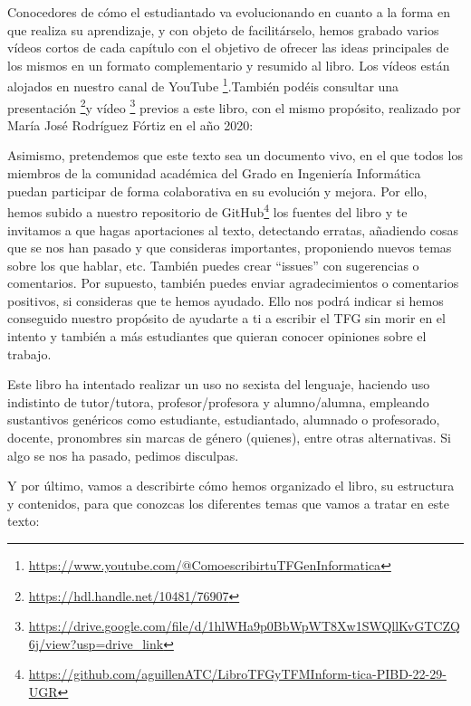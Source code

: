 Conocedores de cómo el estudiantado va evolucionando en cuanto a la forma en que realiza su aprendizaje, y con objeto de facilitárselo, hemos grabado varios vídeos cortos de cada capítulo con el objetivo de ofrecer las ideas principales de los mismos en un formato complementario y resumido al libro. Los vídeos están alojados en nuestro canal de YouTube \footnote{\url{https://www.youtube.com/@ComoescribirtuTFGenInformatica}}.También podéis consultar una presentación \footnote{\url{https://hdl.handle.net/10481/76907}}y vídeo \footnote{\url{https://drive.google.com/file/d/1hlWHa9p0BbWpWT8Xw1SWQllKvGTCZQ6j/view?usp=drive_link}} previos a este libro, con el mismo propósito, realizado por María José Rodríguez Fórtiz en el año 2020:

Asimismo, pretendemos que este texto sea un documento vivo, en el que todos los miembros de la comunidad académica del Grado en Ingeniería Informática puedan participar de forma colaborativa en su evolución y mejora. Por ello, hemos subido a nuestro repositorio de  GitHub\footnote{\url{https://github.com/aguillenATC/LibroTFGyTFMInform-tica-PIBD-22-29-UGR}} los fuentes del libro y te invitamos a que hagas aportaciones al texto, detectando erratas, añadiendo cosas que se nos han pasado y que consideras importantes, proponiendo nuevos temas sobre los que hablar, etc. También puedes crear ``issues'' con sugerencias o comentarios. Por supuesto, también puedes enviar agradecimientos o comentarios positivos, si consideras que te hemos ayudado. Ello nos podrá indicar si hemos conseguido nuestro propósito de ayudarte a ti a escribir el TFG sin morir en el intento y también a más estudiantes que quieran conocer opiniones sobre el trabajo.

Este libro ha intentado realizar un uso no sexista del lenguaje, haciendo uso indistinto de tutor/tutora, profesor/profesora y alumno/alumna, empleando sustantivos genéricos como estudiante, estudiantado, alumnado o profesorado, docente, pronombres sin marcas de género (quienes), entre otras alternativas. Si algo se nos ha pasado, pedimos disculpas.

Y por último, vamos a describirte cómo hemos organizado el libro, su estructura y contenidos, para que conozcas los diferentes temas que vamos a tratar en este texto:

